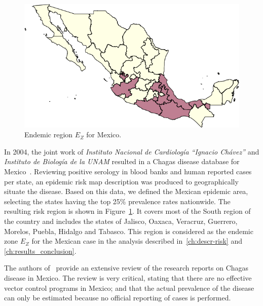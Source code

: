 \begin{figure}[h!]
\centering
\includegraphics[width=0.75\linewidth]
{figures/Ambientes_Gran_Chaco-Mexico1/Ambientes_Gran_Chaco-Mexico1.png}
\caption{Endemic region $E_Z$ for Mexico.}
\label{fig:endemic_zone_mexico}
\end{figure}

In 2004, the joint work of \textit{Instituto Nacional de Cardiología ``Ignacio Chávez''} and  \textit{Instituto de Biología de la UNAM} resulted in a Chagas disease database for Mexico~\cite{cruz2006chagmex}. Reviewing positive serology in blood banks and human reported cases per state, an epidemic risk map description was produced to geographically situate the disease. Based on this data, we defined the Mexican epidemic area, selecting the states having the top 25\% prevalence rates nationwide. The resulting risk region is shown in Figure~\cref{fig:endemic_zone_mexico}. It covers most of the South region of the country and includes the states of Jalisco, Oaxaca, Veracruz, Guerrero, Morelos, Puebla, Hidalgo and Tabasco.
This region is considered as the endemic zone $E_Z$ for the Mexican case in the analysis described in~\cref{ch:descr-risk} and \cref{ch:results_conclusion}.



The authors of~\cite{carabarin2013chagas} provide an extensive review of the
research reports on Chagas disease in Mexico.
The review is very critical, stating that there are no effective vector control programs in Mexico;
and that the actual prevalence of the disease
can only be estimated because no official reporting of cases is performed.

